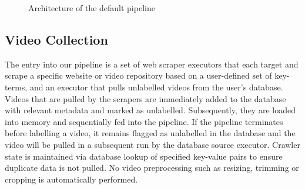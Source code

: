 \documentclass[letterpaper, 10 pt, conference]{IEEEconf}
\begin{document}
\begin{figure}[htpb]
		\centering
		\caption{Architecture of the default pipeline}
		\label{fig:obj-by-class}
\end{figure}


\subsection{Video Collection}


The entry into our pipeline is a set of web scraper executors that each target and scrape a specific website or video repository based on a user-defined set of key-terms, and an executor that pulls unlabelled videos from the user's database. Videos that are pulled by the scrapers are immediately added to the database with relevant metadata and marked as unlabelled. Subsequently, they are loaded into memory and sequentially fed into the pipeline. If the pipeline terminates before labelling a video, it remains flagged as unlabelled in the database and the video will be pulled in a subsequent run by the database source executor. Crawler state is maintained via database lookup of specified key-value pairs to ensure duplicate data is not pulled. No video preprocessing such as resizing, trimming or cropping is automatically performed.
\end{document}
